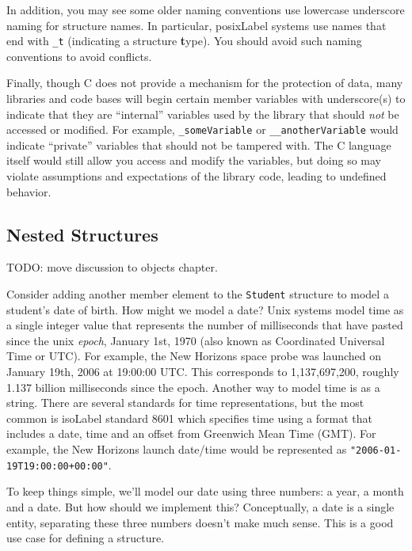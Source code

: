 In addition, you may see some older naming conventions use lowercase 
underscore naming for structure names.  In particular, \gls{posixLabel}
systems use names that end with \texttt{_t} (indicating
a structure \textbf{t}ype).  You should avoid such naming
conventions to avoid conflicts.

Finally, though C does not provide a mechanism for the protection of
data, many libraries and code bases will begin certain member variables
with underscore(s) to indicate that they are ``internal'' variables
used by the library that should \emph{not} be accessed or modified.
For example, \texttt{_someVariable} or \texttt{__anotherVariable} would indicate ``private'' variables that should
not be tampered with.  The C language itself would still allow you 
access and modify the variables, but doing so may violate assumptions
and expectations of the library code, leading to undefined behavior.

\subsection{Nested Structures}

TODO: move discussion to objects chapter.

Consider adding another member element to the \texttt{Student}
structure to model a student's date of birth.  How might we model
a date?  Unix systems model time as a single integer value that
represents the number of milliseconds that have pasted since the
unix \emph{epoch}, January 1st, 1970 (also known as Coordinated 
Universal Time or UTC).  For example, the New Horizons space probe
was launched on January 19th, 2006 at 19:00:00 UTC.  This corresponds
to 1,137,697,200, roughly 1.137 billion milliseconds since the
epoch.  Another way to model time is as a string.  There are several
standards for time representations, but the most common is \gls{isoLabel}
standard 8601 \cite{ISO:1988:IDE} which specifies time using a format that
includes a date, time and an offset from Greenwich Mean Time (GMT).
For example, the New Horizons launch date/time would be represented
as \texttt{"2006-01-19T19:00:00+00:00"}.

To keep things simple, we'll model our date using three numbers: a
year, a month and a date.  But how should we implement this?  
Conceptually, a date is a single entity, separating these three 
numbers doesn't make much sense.  This is a good use case for defining
a structure.

